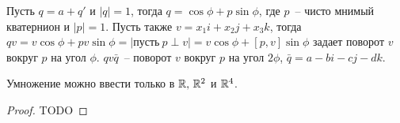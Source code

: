 Пусть $q=a+q'$ и $|q|=1$, тогда $q = \cos{\phi} + p \sin{\phi}$, где $p$~-- чисто мнимый кватернион и $|p|=1$. Пусть также $v = x_1i + x_2j +x_3k$, тогда $qv = v \cos{\phi} + pv \sin{\phi} = |пусть~p \perp v| = v \cos{\phi} + [p,v] \sin{\phi}$ задает поворот $v$ вокруг $p$ на угол $\phi$. $qv \bar{q}$~-- поворот $v$ вокруг $p$ на угол $2\phi$, $\bar{q} = a-bi-cj-dk$.

\begin{theo}[Фробениуса]
	Умножение можно ввести только в $\mathbb{R},\, \mathbb{R}^2$ и $\mathbb{R}^4$.
\end{theo}
\begin{proof}
	TODO
\end{proof}